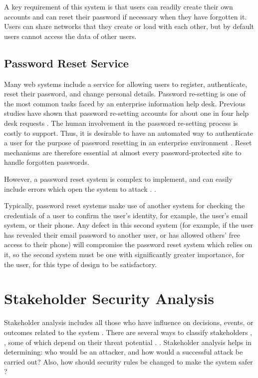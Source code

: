 A key requirement of this system is that users can readily create their own
accounts and can reset their password if necessary when they have forgotten it.
Users can share networks that they create or load with each other, but by default
users cannot access the data of other users.

\subsection{Password Reset Service}
Many web systems include a service for allowing users to register,
authenticate, reset their password, and change personal details.
Password re-setting is one of the most common tasks faced by an
enterprise information help desk. Previous studies have shown that password
re-setting accounts for about one in four help desk requests \cite{bailey2014statistics}. The
human involvement in the password re-setting process is costly to
support. Thus, it is desirable to have an automated way to
authenticate a user for the purpose of password resetting in an
enterprise environment \cite{nimmy2014novel}. Reset mechanisms are therefore
essential at almost every password-protected site to handle forgotten
passwords. 

However, a password reset system is
complex to implement, and can easily include errors which open the system to attack
\iflonger
\cite{routh2018attacks,florencio2014administrator}. 
\else
\cite{routh2018attacks}. 
\fi

Typically, password reset systems make use of another system for checking
the credentials of a user to confirm the user's identity, for example,
the user's email system, or their phone. Any defect
in this second system (for example, if the user has revealed their email password
to another user, or has allowed others' free access to their phone) will compromise the password reset system
which relies on it, so the second system must be one with significantly
greater importance, for the user, for this type of design to be
satisfactory.\\


\section{Stakeholder Security Analysis}\label{stakeholders}

Stakeholder analysis includes all those who have
influence on decisions, events, or outcomes related to
the system \cite{project2018guide,rose2013guide}. There
are several ways to classify stakeholders
\cite{reed2009s,maguire2012role,savage1991strategies,maynard2011stakeholders,bourne2016stakeholder,grimble1997stakeholder,billgren2008approaching},
\cite{maguire2012role,maynard2011stakeholders,bourne2016stakeholder},
some of which depend on their threat potential
\cite{almorsy2016analysis,savage1991strategies,scholl2005interoperability}.
\cite{almorsy2016analysis,savage1991strategies}.
Stakeholder analysis helps in determining: who would
be an attacker, and how would a successful attack be carried out? Also,
how should security rules be changed to make the system safer \cite{diver2007information}?

